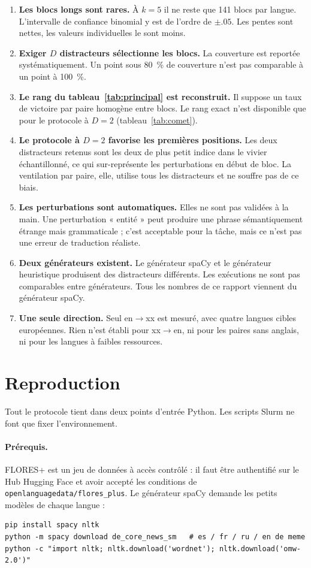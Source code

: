 \documentclass[11pt]{article}
\newcommand{\code}[1]{\texttt{\small #1}}
\begin{document}
\begin{enumerate}
\item \textbf{Les blocs longs sont rares.} À $k=5$ il ne reste que 141 blocs par langue. L'intervalle de confiance binomial y est de l'ordre de $\pm.05$. Les pentes sont nettes, les valeurs individuelles le sont moins.
\item \textbf{Exiger $D$ distracteurs sélectionne les blocs.} La couverture est reportée systématiquement. Un point sous 80~\% de couverture n'est pas comparable à un point à 100~\%.
\item \textbf{Le rang du tableau~\ref{tab:principal} est reconstruit.} Il suppose un taux de victoire par paire homogène entre blocs. Le rang exact n'est disponible que pour le protocole à $D=2$ (tableau~\ref{tab:comet}).
\item \textbf{Le protocole à $D=2$ favorise les premières positions.} Les deux distracteurs retenus sont les deux de plus petit indice dans le vivier échantillonné, ce qui sur-représente les perturbations en début de bloc. La ventilation par paire, elle, utilise tous les distracteurs et ne souffre pas de ce biais.
\item \textbf{Les perturbations sont automatiques.} Elles ne sont pas validées à la main. Une perturbation « entité » peut produire une phrase sémantiquement étrange mais grammaticale ; c'est acceptable pour la tâche, mais ce n'est pas une erreur de traduction réaliste.
\item \textbf{Deux générateurs existent.} Le générateur spaCy et le générateur heuristique produisent des distracteurs différents. Les exécutions ne sont pas comparables entre générateurs. Tous les nombres de ce rapport viennent du générateur spaCy.
\item \textbf{Une seule direction.} Seul en$\to$xx est mesuré, avec quatre langues cibles européennes. Rien n'est établi pour xx$\to$en, ni pour les paires sans anglais, ni pour les langues à faibles ressources.
\end{enumerate}

\section{Reproduction}

Tout le protocole tient dans deux points d'entrée Python.
Les scripts Slurm ne font que fixer l'environnement.

\paragraph{Prérequis.}
FLORES+ est un jeu de données à accès contrôlé : il faut être authentifié sur le Hub Hugging Face et avoir accepté les conditions de \code{openlanguagedata/flores\_plus}.
Le générateur spaCy demande les petits modèles de chaque langue :
\begin{verbatim}
pip install spacy nltk
python -m spacy download de_core_news_sm   # es / fr / ru / en de meme
python -c "import nltk; nltk.download('wordnet'); nltk.download('omw-2.0')"
\end{verbatim}
\end{document}
